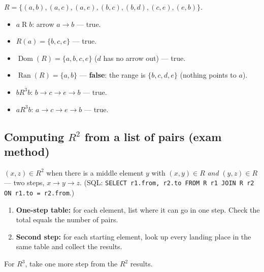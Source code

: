 \documentclass{fkt-notes}
\theoremstyle{definition}
\begin{document}
\begin{example}
  \leavevmode\par\noindent
  \begin{minipage}[c]{0.36\textwidth}
    \centering
  \end{minipage}\hfill
  \begin{minipage}[c]{0.6\textwidth}
    $R = \{(a,b), (a,c), (a,e), (b,c), (b,d), (c,e), (e,b)\}$.
    \begin{itemize}[nosep]
      \item $a \mathrel{R} b$: arrow $a \to b$ --- true.
      \item $R(a) = \{b, c, e\}$ --- true.
      \item $\operatorname{Dom}(R) = \{a, b, c, e\}$ ($d$ has no
            arrow out) --- true.
      \item $\operatorname{Ran}(R) = \{a, b\}$ --- \textbf{false}:
            the range is $\{b, c, d, e\}$ (nothing points to $a$).
      \item $b \mathrel{R^3} b$: $b \to c \to e \to b$ --- true.
      \item $a \mathrel{R^3} b$: $a \to c \to e \to b$ --- true.
    \end{itemize}
  \end{minipage}
\end{example}

\subsection{Computing \texorpdfstring{$R^2$}{R2} from a list of pairs (exam method)}
%
$(x, z) \in R^2$ when there is a middle element $y$ with
$(x, y) \in R$ \emph{and} $(y, z) \in R$ --- two steps, $x \to y \to z$.
(SQL: \texttt{SELECT r1.from, r2.to FROM R r1 JOIN R r2 ON r1.to = r2.from}.)
\begin{enumerate}[label=\arabic*.]
  \item \textbf{One-step table:} for each element, list where it can go
        in one step. Check the total equals the number of pairs.
  \item \textbf{Second step:} for each starting element, look up every
        landing place in the same table and collect the results.
\end{enumerate}
For $R^3$, take one more step from the $R^2$ results.
\end{document}

